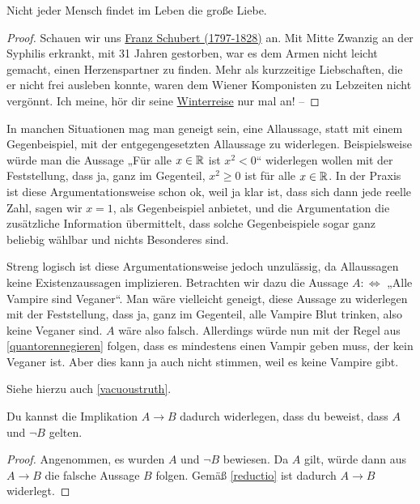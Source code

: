  
\begin{bsp}
    Nicht jeder Mensch findet im Leben die große Liebe.
\end{bsp}
\begin{proof}
    Schauen wir uns \href{https://de.wikipedia.org/wiki/Franz_Schubert}{Franz Schubert (1797-1828)} an. Mit Mitte Zwanzig an der Syphilis erkrankt, mit 31 Jahren gestorben, war es dem Armen nicht leicht gemacht, einen Herzenspartner zu finden. Mehr als kurzzeitige Liebschaften, die er nicht frei ausleben konnte, waren dem Wiener Komponisten zu Lebzeiten nicht vergönnt. Ich meine, hör dir seine \href{https://youtu.be/F6I6Y1LhMKo?t=1665}{Winterreise} nur mal an! --
\end{proof}


\begin{bem}
    In manchen Situationen mag man geneigt sein, eine Allaussage, statt mit einem Gegenbeispiel, mit der entgegengesetzten Allaussage zu widerlegen. Beispielsweise würde man die Aussage „Für alle $x\in \mathbb R$ ist $x^2<0$“ widerlegen wollen mit der Feststellung, dass ja, ganz im Gegenteil, $x^2\ge 0$ ist für alle $x\in \mathbb R$. In der Praxis ist diese Argumentationsweise schon ok, weil ja klar ist, dass sich dann jede reelle Zahl, sagen wir $x=1$, als Gegenbeispiel anbietet, und die Argumentation die zusätzliche Information übermittelt, dass solche Gegenbeispiele sogar ganz beliebig wählbar und nichts Besonderes sind.

    Streng logisch ist diese Argumentationsweise jedoch unzulässig, da Allaussagen keine Existenzaussagen implizieren. Betrachten wir dazu die Aussage $A:\Leftrightarrow$ „Alle Vampire sind Veganer“. Man wäre vielleicht geneigt, diese Aussage zu widerlegen mit der Feststellung, dass ja, ganz im Gegenteil, alle Vampire Blut trinken, also keine Veganer sind. $A$ wäre also falsch. Allerdings würde nun mit der Regel aus \cref{quantorennegieren} folgen, dass es mindestens einen Vampir geben muss, der kein Veganer ist. Aber dies kann ja auch nicht stimmen, weil es keine Vampire gibt.

    Siehe hierzu auch \cref{vacuoustruth}.
\end{bem}


\begin{satz}
    Du kannst die Implikation $A\to B$ dadurch widerlegen, dass du beweist, dass $A$ und $\neg B$ gelten.
\end{satz}
\begin{proof}
    Angenommen, es wurden $A$ und $\neg B$ bewiesen. Da $A$ gilt, würde dann aus $A\to B$ die falsche Aussage $B$ folgen. Gemäß \cref{reductio} ist dadurch $A\to B$ widerlegt.
\end{proof}


